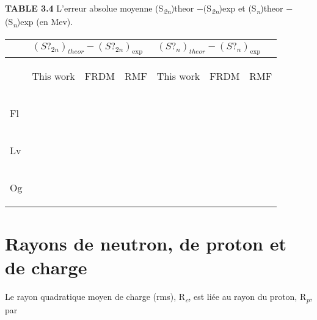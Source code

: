 \textbf{TABLE 3.4} L’erreur absolue moyenne (S\textit{\textsubscript{2n}})theor −(S\textit{\textsubscript{2n}})exp et (S\textit{\textsubscript{n}})theor −(S\textit{\textsubscript{n}})exp (en Mev).

\begin{center}
\tablefirsthead{}
\tablehead{}
\tabletail{}
\tablelasttail{}
\begin{supertabular}{|m{0.84275985in}|m{0.8420598in}|m{0.84275985in}|m{0.84275985in}|m{0.84275985in}|m{0.84275985in}|m{0.8420598in}|}
\hline
 &
 &
\\\hline
 &
{\begin{french} This work\end{french}} &
{\begin{french} FRDM\end{french}} &
{\begin{french} RMF\end{french}} &
{\begin{french} This work\end{french}} &
{\begin{french} FRDM\end{french}} &
{\begin{french} RMF\end{french}}\\\hline
{\begin{french} Fl\end{french}} &
 &
 &
 &
 &
 &
\\\hline
{\begin{french} Lv\end{french}} &
 &
 &
 &
 &
 &
\\\hline
{\begin{french} Og\end{french}} &
 &
 &
 &
 &
 &
\\\hline
\end{supertabular}
\end{center}
\section{Rayons de neutron, de proton et de charge  \ \ }

 Le rayon quadratique moyen de charge (rms), R\textit{\textsubscript{c}}, est liée au rayon du proton, R\textit{\textsubscript{p}}, par

